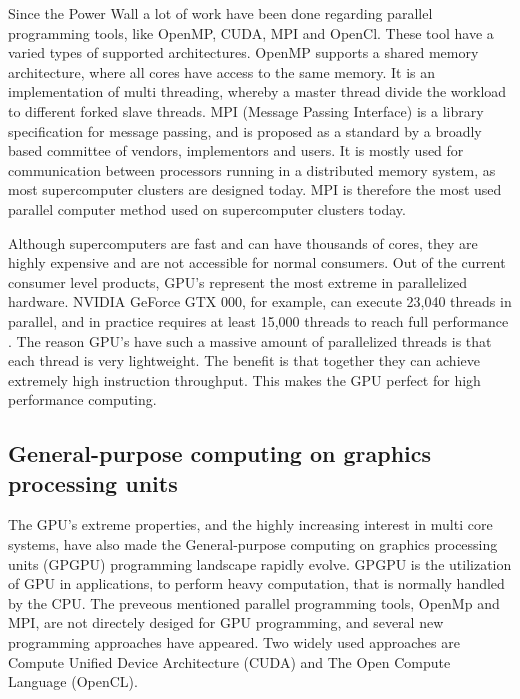 Since the Power Wall a lot of work have been done regarding parallel programming tools, like OpenMP, CUDA, MPI and OpenCl. These tool have a varied types of supported architectures. OpenMP supports a shared memory architecture, where all cores have access to the same memory. It is an implementation of multi threading, whereby a master thread divide the workload to different forked slave threads. MPI (Message Passing Interface) is a library specification for message passing, and is proposed as a standard by a broadly based committee of vendors, implementors and users. It is mostly used for communication between processors running in a distributed memory system, as most supercomputer clusters are designed today. MPI is therefore the most used parallel computer method used on supercomputer clusters today.

Although supercomputers are fast and can have thousands of cores, they are highly expensive and are not accessible for normal consumers. Out of the current consumer level products, GPU's represent the most extreme in parallelized hardware. NVIDIA GeForce GTX 000, for example, can execute 23,040 threads in parallel, and in practice requires at least 15,000 threads to reach full performance \citep{karras2012}. The reason GPU's have such a massive amount of parallelized threads is that each thread is very lightweight. The benefit is that together they can achieve extremely high instruction throughput. This makes the GPU perfect for high performance computing.

\subsection{General-purpose computing on graphics processing units} %
\label{ssub:general_purpose_computing_on_graphics_processing_units}

The GPU's extreme properties, and the highly increasing interest in multi core systems, have also made the General-purpose computing on graphics processing units (GPGPU) programming landscape rapidly evolve. GPGPU is the utilization of GPU in applications, to perform heavy computation, that is normally handled by the CPU\@. The preveous mentioned parallel programming tools, OpenMp and MPI, are not  directely desiged for GPU programming, and several new programming approaches have appeared. Two widely used approaches are Compute Unified Device Architecture (CUDA) and The Open Compute Language (OpenCL).

